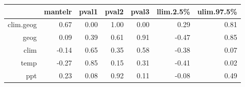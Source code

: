\begin{table}[ht]
\centering
\begin{tabular}{rrrrrrr}
  \hline
 & mantelr & pval1 & pval2 & pval3 & llim.2.5\% & ulim.97.5\% \\ 
  \hline
clim.geog & 0.67 & 0.00 & 1.00 & 0.00 & 0.29 & 0.81 \\ 
  geog & 0.09 & 0.39 & 0.61 & 0.91 & -0.47 & 0.85 \\ 
  clim & -0.14 & 0.65 & 0.35 & 0.58 & -0.38 & 0.07 \\ 
  temp & -0.27 & 0.85 & 0.15 & 0.31 & -0.41 & 0.02 \\ 
  ppt & 0.23 & 0.08 & 0.92 & 0.11 & -0.08 & 0.49 \\ 
   \hline
\end{tabular}
\end{table}
